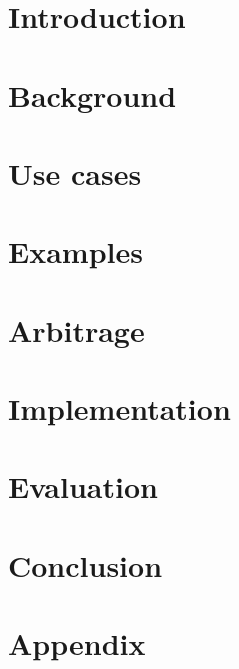 


\begin{abstract}
    
\end{abstract}

\section{Introduction}\label{intro}


\section{Background}\label{back}


\section{Use cases}\label{use}


\section{Examples}\label{ex}


\section{Arbitrage}\label{arb}


\section{Implementation}\label{imp}


\section{Evaluation}\label{eval}


\section{Conclusion}\label{con}


\section{Appendix}\label{con}


\newpage
\printbibliography


